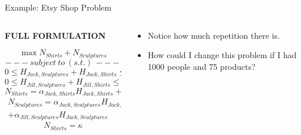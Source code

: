 \documentclass[10pt, aspectratio=169]{beamer}
\begin{document}
\begin{frame}{Example: Etsy Shop Problem}
    \begin{columns}
        \begin{column}{0.6\textwidth}
            \begin{center}
                \textbf{FULL FORMULATION}
        
                $$\max N_{Shirts} + N_{Sculptures}$$
                $$---\ subject\ to\ (s.t.)\ ---$$
                $$0 \leq H_{Jack,Sculptures} + H_{Jack,Shirts} \leq \tau^{DAY}$$
                $$0 \leq H_{Jill,Sculptures} + H_{Jill,Shirts} \leq \tau^{DAY}$$
                $$N_{Shirts} = \alpha_{Jack,Shirts} H_{Jack,Shirts} + \alpha_{Jill,Shirts} H_{Jack,Shirts}$$
                \begin{equation}
                    \begin{split}
                        N_{Sculptures} = \alpha_{Jack,Sculptures} H_{Jack,Sculptures} \\ + \alpha_{Jill,Sculptures} H_{Jack,Sculptures}
                    \end{split}
                    \tag*{}
                \end{equation}
                $$N_{Shirts} = \kappa$$
            \end{center}
        \end{column}
        \begin{column}{0.4\textwidth}
            \begin{itemize}
                \item Notice how much repetition there is.
                \item How could I change this problem if I had 1000 people and 75 products?
            \end{itemize}
        \end{column}
    \end{columns}
\end{frame}
\end{document}
